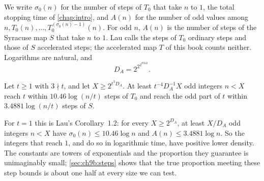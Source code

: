 We write $\sigma_0(n)$ for the number of steps of $T_0$ that take $n$ to $1$, the total stopping time of \cref{chap:intro}, and $A(n)$ for the number of odd values among $n,T_0(n),\ldots,T_0^{(\sigma_0(n)-1)}(n)$. For odd $n$, $A(n)$ is the number of steps of the Syracuse map $S$ that take $n$ to $1$. Lau calls the steps of $T_0$ ordinary steps and those of $S$ accelerated steps; the accelerated map $T$ of this book counts neither. Logarithms are natural, and
\[
  D_A=2^{2^{2^{87640}}} .
\]

\begin{theorem}\label{thm:ch9b:lau}
Let $t\ge1$ with $3\nmid t$, and let $X\ge2^{t^3D_A}$. At least $t^{-4}D_A^{-1}X$ odd integers $n<X$ reach $t$ within $10.46\log(n/t)$ steps of $T_0$ and reach the odd part of $t$ within $3.4881\log(n/t)$ steps of $S$.
\end{theorem}

For $t=1$ this is Lau's Corollary~1.2: for every $X\ge2^{D_A}$, at least $X/D_A$ odd integers $n<X$ have $\sigma_0(n)\le10.46\log n$ and $A(n)\le3.4881\log n$. So the integers that reach $1$, and do so in logarithmic time, have positive lower density. The constants are towers of exponentials and the proportion they guarantee is unimaginably small; \cref{sec:ch9b:steps} shows that the true proportion meeting these step bounds is about one half at every size we can test.

